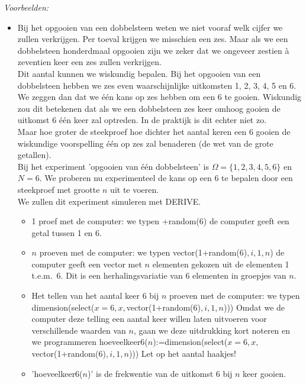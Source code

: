 \begin{small}
{\em Voorbeelden:}

\begin{itemize}
\item 

Bij het opgooien van een dobbelsteen weten we niet vooraf welk cijfer
we zullen verkrijgen. Per toeval krijgen we misschien een zes. Maar als
we een dobbelsteen honderdmaal opgooien zijn we zeker dat we ongeveer
zestien \` a zeventien keer een zes zullen verkrijgen.\\
Dit aantal kunnen we wiskundig bepalen. Bij het opgooien van een dobbelsteen 
hebben we zes even waarschijnlijke uitkomsten 1, 2, 3, 4, 5 en 6. 
We zeggen dan dat we \' e\' en kans op zes hebben om een 6 te gooien. Wiskundig
zou dit betekenen dat als we een dobbelsteen zes keer omhoog gooien de
uitkomst 6 \' e\' en keer zal optreden. In de praktijk is dit echter niet zo.\\
Maar hoe groter de steekproef hoe dichter het aantal keren een 6
gooien de wiskundige voorspelling \' e\' en op zes zal benaderen (de wet van
de grote getallen). \\
Bij het experiment 'opgooien van \'e\'en dobbelsteen' is  $\Omega=\lbrace 1,2,3,4,5,6\rbrace$ en $N=6$. We proberen nu experimenteel de kans op een 6 te bepalen door een steekproef met grootte $n$ uit te voeren.   \\
We zullen dit  experiment  simuleren met   DERIVE. 
\begin{itemize}
\item
1 proef met de computer: we typen 
+random(6)\ederive 
de computer geeft een getal tussen 1 en 6.
\item
$n$ proeven met de computer: we typen
 \bderive  vector(1+random(6)$,i,1,n$) \ederive
de computer geeft een vector met $n$ elementen gekozen uit de elementen 1 t.e.m.\ 6. Dit is een herhalingsvariatie van 6 elementen in groepjes van $n$.
\item 
Het tellen van het aantal keer 6 bij $n$ proeven met de computer: we typen \bderive  dimension(select($x=6,x,$vector(1+random(6)$,i,1,n$)))\ederive 
Omdat we de computer deze telling een aantal keer willen laten uitvoeren voor verschillende waarden van $n$, gaan we deze uitdrukking kort noteren en we programmeren 
\bderive hoeveelkeer6($n$):=dimension(select($x=6,x,$vector(1+random(6)$,i,1,n$)))\ederive  
Let op het aantal haakjes!
\item 
'hoeveelkeer6($n$)' is de frekwentie van de uitkomst 6 bij $n$ keer gooien.\\

\end{itemize}
\end{itemize}
\end{small}
